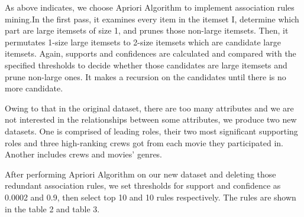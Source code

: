 \documentclass[conference]{IEEEtran}
\begin{document}
As above indicates, we choose Apriori Algorithm\cite{Borgelt} to implement association rules mining.In the first pass, it examines every item in the itemset I, determine which part are large itemsets of size 1, and prunes those non-large itemsets. Then, it permutates 1-size large itemsets to 2-size itemsets which are candidate large itemsets. Again, supports and confidences are calculated and compared with the specified thresholds to decide whether those candidates are large itemsets and prune non-large ones. It makes a recursion on the candidates until there is no more candidate.

Owing to that in the original dataset, there are too many attributes and we are not interested in the relationships between some attributes, we produce two new datasets. One is comprised of leading roles, their two most significant supporting roles and three high-ranking crews got from each movie they participated in. Another includes crews and movies’ genres.

After performing Apriori Algorithm on our new dataset and deleting those redundant association rules, we set thresholds for support and confidence as 0.0002 and 0.9, then select top 10 and 10 rules respectively. The rules are shown in the table 2 and table 3.
\end{document}
